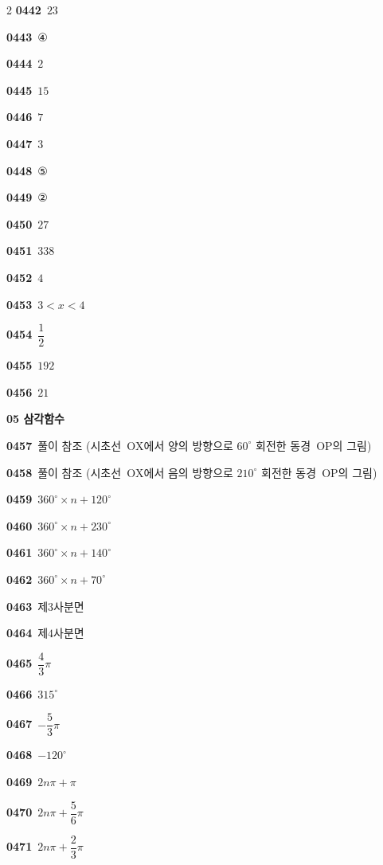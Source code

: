 \documentclass[10pt,a4paper]{article}
\newcommand{\pt}[1]{\mathrm{#1}}
\begin{document}
\begin{multicols}{2}
\noindent\textbf{0442}\ $23$\par
\noindent\textbf{0443}\ ④\par
\noindent\textbf{0444}\ $2$\par
\noindent\textbf{0445}\ $15$\par
\noindent\textbf{0446}\ $7$\par
\noindent\textbf{0447}\ $3$\par
\noindent\textbf{0448}\ ⑤\par
\noindent\textbf{0449}\ ②\par
\noindent\textbf{0450}\ $27$\par
\noindent\textbf{0451}\ $338$\par
\noindent\textbf{0452}\ $4$\par
\noindent\textbf{0453}\ $3<x<4$\par
\noindent\textbf{0454}\ $\dfrac{1}{2}$\par
\noindent\textbf{0455}\ $192$\par
\noindent\textbf{0456}\ $21$\par
\noindent\textbf{05 삼각함수}\par\smallskip
\noindent\textbf{0457}\ 풀이 참조 (시초선~$\pt{OX}$에서 양의 방향으로 $60^\circ$ 회전한 동경~$\pt{OP}$의 그림)\par
\noindent\textbf{0458}\ 풀이 참조 (시초선~$\pt{OX}$에서 음의 방향으로 $210^\circ$ 회전한 동경~$\pt{OP}$의 그림)\par
\noindent\textbf{0459}\ $360^\circ\times n+120^\circ$\par
\noindent\textbf{0460}\ $360^\circ\times n+230^\circ$\par
\noindent\textbf{0461}\ $360^\circ\times n+140^\circ$\par
\noindent\textbf{0462}\ $360^\circ\times n+70^\circ$\par
\noindent\textbf{0463}\ 제$3$사분면\par
\noindent\textbf{0464}\ 제$4$사분면\par
\noindent\textbf{0465}\ $\dfrac{4}{3}\pi$\par
\noindent\textbf{0466}\ $315^\circ$\par
\noindent\textbf{0467}\ $-\dfrac{5}{3}\pi$\par
\noindent\textbf{0468}\ $-120^\circ$\par
\noindent\textbf{0469}\ $2n\pi+\pi$\par
\noindent\textbf{0470}\ $2n\pi+\dfrac{5}{6}\pi$\par
\noindent\textbf{0471}\ $2n\pi+\dfrac{2}{3}\pi$\par

\end{multicols}
\end{document}
